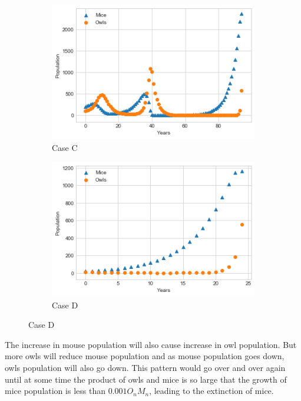 \documentclass[10pt]{report}
\begin{document}
\begin{enumerate}
\begin{enumerate}[a.]
\begin{figure}[H]
\begin{subfigure}[b]{.5\linewidth}
			\end{subfigure}
			\begin{subfigure}[b]{.5\linewidth}
				\caption{Case C}
				\includegraphics[width=\linewidth]{s1_4/caseC.png}
			\end{subfigure}%
			\begin{subfigure}[b]{.5\linewidth}
				\caption{Case D}
				\includegraphics[width=\linewidth]{s1_4/caseD.png}
			\end{subfigure}
		\end{figure}
		The increase in mouse population will also cause increase in owl population. But more owls will reduce mouse population and as mouse population goes down, owls population will also go down. This pattern would go over and over again until at some time the product of owls and mice is so large that the growth of mice population is less than $0.001 O_n M_n$, leading to the extinction of mice.
		

\end{enumerate}
\end{enumerate}
\end{document}
